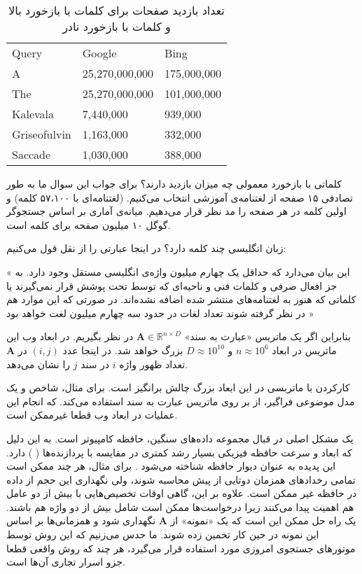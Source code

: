 \begin{table}[h]
\caption{
تعداد بازدید صفحات برای کلمات با بازخورد بالا و کلمات با بازخورد نادر
}
\centering
\bigskip
\begin{latin}
\begin{tabular}{lll}
\hline
Query        & Google         & Bing        \\ \hhline{===}
A            & 25,270,000,000 & 175,000,000 \\
The          & 25,270,000,000 & 101,000,000 \\
Kalevala     & 7,440,000      & 939,000     \\
Griseofulvin & 1,163,000      & 332,000     \\
Saccade      & 1,030,000      & 388,000     \\
\hline
\end{tabular}
\end{latin}
\label{tab:searchengin}
\end{table}


کلماتی با بازخورد معمولی چه میزان بازدید دارند؟ برای جواب این سوال ما به طور تصادفی ۱۵ صفحه از لغتنامه‌‌ی آموزشی انتخاب می‌کنیم.
\cite{litez94}
(لغتنامه‌ای با ۵۷،۱۰۰ کلمه) و اولین کلمه در هر صفحه را مد نظر قرار می‌دهیم. میانه‌ی آماری بر اساس جستجو‌گر گوگل ۱۰ میلیون صفحه برای کلمه است.

زبان انگلیسی چند کلمه دارد؟ در اینجا عبارتی را از 
نقل قول می‌کنیم:

« این بیان می‌دارد که حداقل یک چهارم میلیون واژه‌ی انگلیسی مستقل وجود دارد. به جز افعال صرفی و کلمات فنی و ناحیه‌ای که توسط 
%
تحت پوشش قرار نمی‌گیرند یا کلماتی که هنوز به لغتنامه‌های منتشر شده اضافه نشده‌اند. در صورتی که این موارد هم در نظر گرفته شوند تعداد لغات در حدود سه چهارم میلیون لغت خواهد بود »

بنابراین اگر یک ماتریس «عبارت به سند» 
$\mathbf{A} \in \mathbb{R}^{n \times D}$
در نظر بگیریم. در ابعاد وب این ماتریس در ابعاد 
$n \approx 10^6$
و 
$D \approx 10^{10}$
بزرگ خواهد شد.
در اینجا عدد 
$(i,j)$
در 
$\mathbf{A}$
تعداد ظهور واژه 
$i$
در سند 
$j$
را نشان می‌دهد.

کارکردن با ماتربسی در این ابعاد بزرگ چالش برانگیز است. برای مثال، شاخص 
%
\cite{litez58}
و یک مدل موضوعی فراگیر، از 
%
بر روی ماتریس عبارت به سند استفاده می‌کند. که انجام این عملیات در ابعاد وب قطعا غیرممکن است.

یک مشکل اصلی در قبال مجموعه داده‌های سنگین، حافظه کامپیوتر است. به این دلیل که ابعاد و سرعت حافظه فیزیکی بسیار رشد کمتری در مقایسه با پردازنده‌ها (
) دارد. این پدیده به عنوان دیوار حافظه شناخته می‌شود
\cite{litez139, litez168}
. برای مثال،‌ هر چند ممکن است تمامی رخداد‌های همزمان دوتایی از پیش محاسبه شوند، ولی نگهداری این حجم از داده در حافظه غیر ممکن است. علاوه بر این، گاهی اوقات تخصیص‌‌هایی با بیش از دو عامل هم اهمیت پیدا می‌کنند زیرا درخواست‌ها ممکن است شامل بیش از دو واژه هم باشند. یک راه حل ممکن این است که یک «نمونه» از 
$\mathbf{A}$
 نگهداری شود و همزمانی‌ها بر اساس این نمونه در حین کار تخمین زده شوند. ما حدس می‌زنیم که این روش توسط موتورهای جستجوی امروزی مورد استفاده قرار می‌گیرد، هر چند که روش واقعی قطعا جزو اسرار تجاری آن‌ها است.

